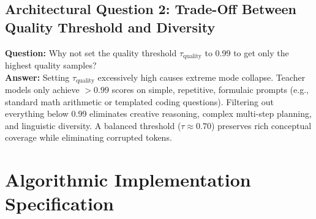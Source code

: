 \documentclass[11pt,a4paper]{article}
\theoremstyle{definition}
\begin{document}
\subsection{Architectural Question 2: Trade-Off Between Quality Threshold and Diversity}
\textbf{Question:} Why not set the quality threshold $\tau_{\text{quality}}$ to 0.99 to get only the highest quality samples?\\
\textbf{Answer:} Setting $\tau_{\text{quality}}$ excessively high causes extreme mode collapse. Teacher models only achieve $>0.99$ scores on simple, repetitive, formulaic prompts (e.g., standard math arithmetic or templated coding questions). Filtering out everything below 0.99 eliminates creative reasoning, complex multi-step planning, and linguistic diversity. A balanced threshold ($\tau \approx 0.70$) preserves rich conceptual coverage while eliminating corrupted tokens.

\section{Algorithmic Implementation Specification}
\end{document}
